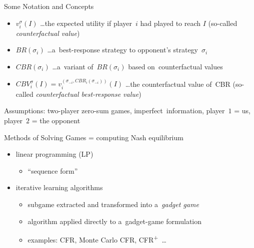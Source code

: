 \documentclass{beamer}
\theoremstyle{definition}
\newcommand{\cfrplus}{CFR\textsuperscript{+}~}
\begin{document}
  \begin{frame}{Some Notation and Concepts}
    \pause
    \begin{itemize}[<+- | alert@+>]
      \item $v _i ^{\sigma} (I)$ \ldots the expected utility if player~$i$ had played to reach $I$ (so-called \emph{counterfactual value})
      \item $BR(\sigma_i)$ \ldots a~best-response strategy to opponent's strategy~$\sigma_i$
      \item $CBR(\sigma_i)$ \ldots a~variant of~$BR(\sigma_i)$ based on~counterfactual values
      \item $CBV _i ^\sigma (I) = v _i ^{(\sigma _{-i}, CBR _i (\sigma _{-i} ))} (I)$ \ldots the counterfactual value of~CBR (so-called \emph{counterfactual best-response value})
    \end{itemize}
    \pause

    Assumptions: two-player zero-sum games, imperfect~information, player~$1$ = us, player~$2$ = the opponent
  \end{frame}

  \begin{frame}{Methods of Solving Games}
    = computing Nash equilibrium
    \pause

    \begin{itemize}[<+- | alert@+>]
      \item linear programming (LP)
        \begin{itemize}
          \item ``sequence form''
        \end{itemize}
      \item iterative learning algorithms 
        \begin{itemize}
          \item subgame extracted and transformed into a~\emph{gadget game}
          \item algorithm applied directly to a~gadget-game formulation
          \item examples: CFR, Monte Carlo CFR, \cfrplus\ldots
        \end{itemize}
    \end{itemize}
  \end{frame}
\end{document}
